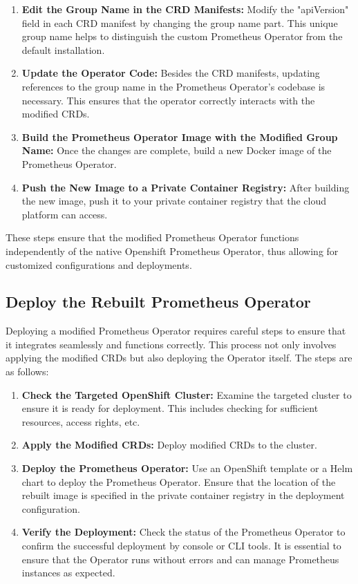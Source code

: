 \begin{enumerate}
    \item \textbf{Edit the Group Name in the \ac{CRD} Manifests:} Modify the "apiVersion" field in each \ac{CRD} manifest by changing the group name part. This unique group name helps to distinguish the custom Prometheus Operator from the default installation. 
    \item \textbf{Update the Operator Code:} Besides the \ac{CRD} manifests, updating references to the group name in the Prometheus Operator's codebase is necessary. This ensures that the operator correctly interacts with the modified \ac{CRD}s. 
    \item \textbf{Build the Prometheus Operator Image with the Modified Group Name:} Once the changes are complete, build a new Docker image of the Prometheus Operator. 
    \item \textbf{Push the New Image to a Private Container Registry:} After building the new image, push it to your private container registry that the cloud platform can access. 
\end{enumerate}

These steps ensure that the modified Prometheus Operator functions independently of the native Openshift Prometheus Operator, thus allowing for customized configurations and deployments. 

\subsection{Deploy the Rebuilt Prometheus Operator}

Deploying a modified Prometheus Operator requires careful steps to ensure that it integrates seamlessly and functions correctly. This process not only involves applying the modified \ac{CRD}s but also deploying the Operator itself. The steps are as follows: 

\begin{enumerate}
    \item \textbf{Check the Targeted OpenShift Cluster:} Examine the targeted cluster to ensure it is ready for deployment. This includes checking for sufficient resources, access rights, etc. 
    \item \textbf{Apply the Modified CRDs:} Deploy modified CRDs to the cluster. 
    \item \textbf{Deploy the Prometheus Operator:} Use an OpenShift template or a Helm chart to deploy the Prometheus Operator. Ensure that the location of the rebuilt image is specified in the private container registry in the deployment configuration. 
    \item \textbf{Verify the Deployment:} Check the status of the Prometheus Operator to confirm the successful deployment by console or \ac{CLI} tools. It is essential to ensure that the Operator runs without errors and can manage Prometheus instances as expected. 
\end{enumerate}


